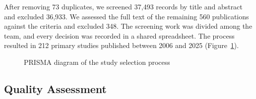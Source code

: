 \documentclass[sigconf,review]{acmart}
\begin{document}
After removing 73 duplicates, we screened 37,493 records by title and abstract and excluded 36,933. We assessed the full text of the remaining 560 publications against the criteria and excluded 348. The screening work was divided among the team, and every decision was recorded in a shared spreadsheet. The process resulted in 212 primary studies published between 2006 and 2025 (Figure~\ref{fig:prisma}).

\begin{figure}[t]
    \centering
    \resizebox{0.95\columnwidth}{!}{}
    \caption{PRISMA diagram of the study selection process}
    \label{fig:prisma}
\end{figure}

\subsection{Quality Assessment}
\label{subsec:quality-assessment}
\end{document}
